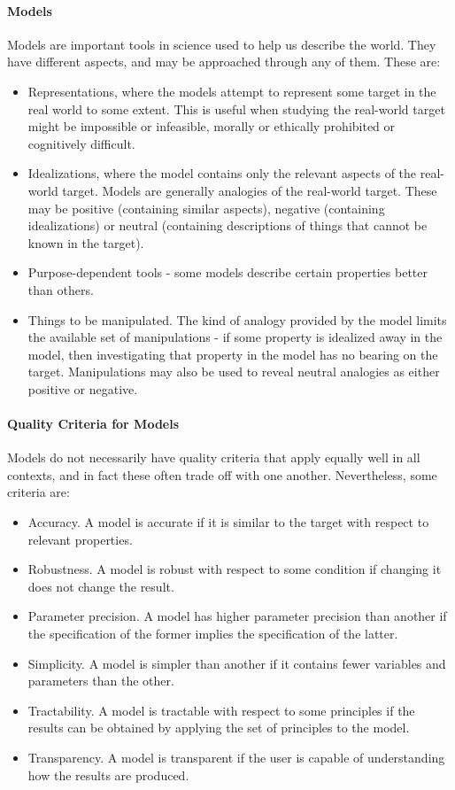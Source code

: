 \paragraph{Models}
Models are important tools in science used to help us describe the world. They have different aspects, and may be approached through any of them. These are:
\begin{itemize}
	\item Representations, where the models attempt to represent some target in the real world to some extent. This is useful when studying the real-world target might be impossible or infeasible, morally or ethically prohibited or cognitively difficult.
	\item Idealizations, where the model contains only the relevant aspects of the real-world target. Models are generally analogies of the real-world target. These may be positive (containing similar aspects), negative (containing idealizations) or neutral (containing descriptions of things that cannot be known in the target).
	\item Purpose-dependent tools - some models describe certain properties better than others.
	\item Things to be manipulated. The kind of analogy provided by the model limits the available set of manipulations - if some property is idealized away in the model, then investigating that property in the model has no bearing on the target. Manipulations may also be used to reveal neutral analogies as either positive or negative.
\end{itemize}

\paragraph{Quality Criteria for Models}
Models do not necessarily have quality criteria that apply equally well in all contexts, and in fact these often trade off with one another. Nevertheless, some criteria are:
\begin{itemize}
	\item Accuracy. A model is accurate if it is similar to the target with respect to relevant properties.
	\item Robustness. A model is robust with respect to some condition if changing it does not change the result.
	\item Parameter precision. A model has higher parameter precision than another if the specification of the former implies the specification of the latter.
	\item Simplicity. A model is simpler than another if it contains fewer variables and parameters than the other.
	\item Tractability. A model is tractable with respect to some principles if the results can be obtained by applying the set of principles to the model.
	\item Transparency. A model is transparent if the user is capable of understanding how the results are produced.
\end{itemize}

